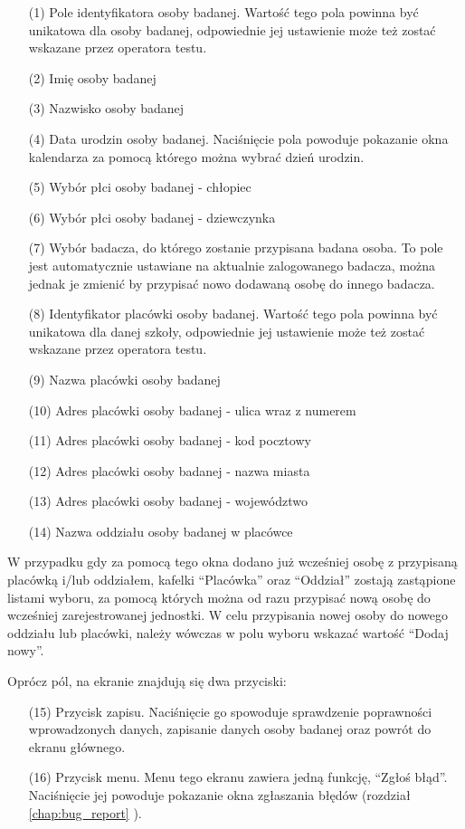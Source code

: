 \documentclass[a4paper,10pt,twosided]{book}
\newcommand{\refwithpage}[3]{
\ref{#1}\ifthenelse{\equal{\thepage}{\pageref{#1}}}{}{#2\pageref{#1}#3}%
}
\newcommand{\ppref}[1]{\refwithpage{#1}{ -- strona }{}}
\begin{document}
\begin{enumerate}
\item[(1)] Pole identyfikatora osoby badanej. Wartość tego pola powinna być unikatowa dla osoby badanej, odpowiednie jej ustawienie może też zostać wskazane przez operatora testu.
\item[(2)] Imię osoby badanej
\item[(3)] Nazwisko osoby badanej
\item[(4)] Data urodzin osoby badanej. Naciśnięcie pola powoduje pokazanie okna kalendarza za pomocą którego można wybrać dzień urodzin.
\item[(5)] Wybór płci osoby badanej - chłopiec
\item[(6)] Wybór płci osoby badanej - dziewczynka
\item[(7)] Wybór badacza, do którego zostanie przypisana badana osoba. To pole jest automatycznie ustawiane na aktualnie zalogowanego badacza, można jednak je zmienić by przypisać nowo dodawaną osobę do innego badacza.
\item[(8)] Identyfikator placówki osoby badanej. Wartość tego pola powinna być unikatowa dla danej szkoły, odpowiednie jej ustawienie może też zostać wskazane przez operatora testu.
\item[(9)] Nazwa placówki osoby badanej
\item[(10)] Adres placówki osoby badanej - ulica wraz z numerem
\item[(11)] Adres placówki osoby badanej - kod pocztowy
\item[(12)] Adres placówki osoby badanej - nazwa miasta
\item[(13)] Adres placówki osoby badanej - województwo
\item[(14)] Nazwa oddziału osoby badanej w placówce
\end{enumerate}

W przypadku gdy za pomocą tego okna dodano już wcześniej osobę z przypisaną placówką i/lub oddziałem, kafelki ``Placówka'' oraz ``Oddział'' zostają zastąpione listami wyboru, za pomocą których można od razu przypisać nową osobę do wcześniej zarejestrowanej jednostki. W celu przypisania nowej osoby do nowego oddziału lub placówki, należy wówczas w polu wyboru wskazać wartość ``Dodaj nowy''.

Oprócz pól, na ekranie znajdują się dwa przyciski: 

\begin{enumerate}
\item[(15)] Przycisk zapisu. Naciśnięcie go spowoduje sprawdzenie poprawności wprowadzonych danych, zapisanie danych osoby badanej oraz powrót do ekranu głównego.
\item[(16)] Przycisk menu. Menu tego ekranu zawiera jedną funkcję, ``Zgłoś błąd''. Naciśnięcie jej powoduje pokazanie okna zgłaszania błędów (rozdział \ppref{chap:bug_report}).
\end{enumerate}
\end{document}
